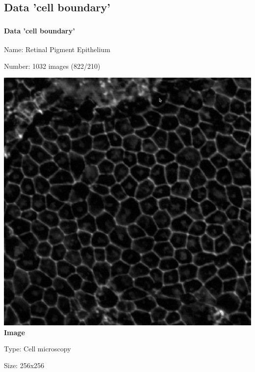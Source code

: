 \def\slidetitle{Data 'cell boundary'}

\subsection{\slidetitle}
\begin{frame}
  \frametitle{\sectiontitle}
  \framesubtitle{\slidetitle}

  \begin{minipage}[h!]{0.40\textwidth}
    Name: Retinal Pigment Epithelium

    Number: 1032 images (822/210)

    \centering
    \includegraphics[scale=0.12]{./img/3_benchmark/image.png}
    \textbf{Image}
  \end{minipage}\hfill
  \begin{minipage}[h!]{0.40\textwidth}
    Type: Cell microscopy

    Size: 256x256


\end{minipage}
\end{frame}
